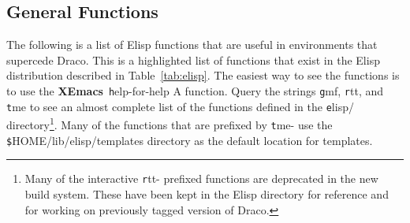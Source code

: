 \documentclass[11pt]{nmemo}
\newcommand{\comp}[1]{{\normalfont\texttt#1}}
\newcommand{\draco}{{\normalfont\sffamily Draco}}
\newcommand{\xemacs}{{\normalfont\bfseries XEmacs}}
\begin{document}
\subsection{General Functions}
\label{sec:gfunc}

The following is a list of Elisp functions that are useful in
environments that supercede \draco.  This is a highlighted list of
functions that exist in the Elisp distribution described in
Table~\ref{tab:elisp}.  The easiest way to see the functions is to use
the \xemacs\ \comp{help-for-help A} function.  Query the strings
\comp{gmf}, \comp{rtt}, and \comp{tme} to see an almost complete list
of the functions defined in the \comp{elisp/} directory\footnote{Many
  of the interactive \comp{rtt-} prefixed functions are deprecated in
  the new build system.  These have been kept in the Elisp directory
  for reference and for working on previously tagged version of
  \draco.}.  Many of the functions that are prefixed by \comp{tme-}
use the \comp{\$HOME/lib/elisp/templates} directory as the default
location for templates.
\end{document}
